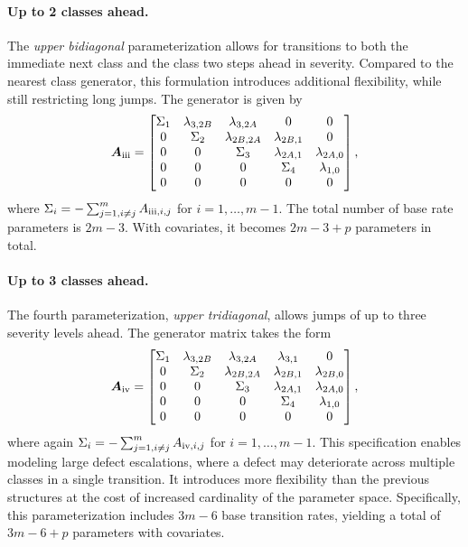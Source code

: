 \documentclass{article}
\newcommand{\RN}[1]{\textup{\uppercase\expandafter{\romannumeral#1}}}
\begin{document}
\paragraph{Up to 2 classes ahead.}
The \textit{upper bidiagonal} parameterization allows for transitions to both the immediate next class and the class two steps ahead in severity. Compared to the nearest class generator, this formulation introduces additional flexibility, while still restricting long jumps. The generator is given by
\begin{align}
\bm{A}_{\RN{3}} = \begin{bmatrix}
\Sigma_1 & \lambda_{3,2B} & \lambda_{3,2A} & 0 & 0 \\
0 & \Sigma_2 & \lambda_{2B,2A} & \lambda_{2B,1} & 0 \\
0 & 0 & \Sigma_3 & \lambda_{2A,1} & \lambda_{2A,0} \\
0 & 0 & 0 & \Sigma_4 & \lambda_{1,0} \\
0 & 0 & 0 & 0 & 0 \\
\end{bmatrix}, \label{eq:generator_bidiagonal}
\end{align}
where $\Sigma_i = -\sum_{j=1, i \neq j}^m A_{\RN{3},i,j}$ for $i = 1, \dots, m-1$.
The total number of base rate parameters is $2m - 3$. With covariates, it becomes $2m - 3 + p$ parameters in total.

\paragraph{Up to 3 classes ahead.}
The fourth parameterization, \textit{upper tridiagonal}, allows jumps of up to three severity levels ahead. The generator matrix takes the form
\begin{align}
\bm{A}_{\RN{4}}= \begin{bmatrix}
\Sigma_1 & \lambda_{3,2B} & \lambda_{3,2A} & \lambda_{3,1} & 0 \\
0 & \Sigma_2 & \lambda_{2B,2A} & \lambda_{2B,1} & \lambda_{2B,0} \\
0 & 0 & \Sigma_3 & \lambda_{2A,1} & \lambda_{2A,0} \\
0 & 0 & 0 & \Sigma_4 & \lambda_{1,0} \\
0 & 0 & 0 & 0 & 0 \\
\end{bmatrix}, \label{eq:generator_tridiagonal}
\end{align}
where again $\Sigma_i = -\sum_{j=1, i \neq j}^m A_{\RN{4},i,j}$ for $i = 1, \dots, m-1$.
This specification enables modeling large defect escalations, where a defect may deteriorate across multiple classes in a single transition. It introduces more flexibility than the previous structures at the cost of increased cardinality of the parameter space. Specifically, this parameterization includes $3m - 6$ base transition rates, yielding a total of $3m - 6 + p$ parameters with covariates.
\end{document}
